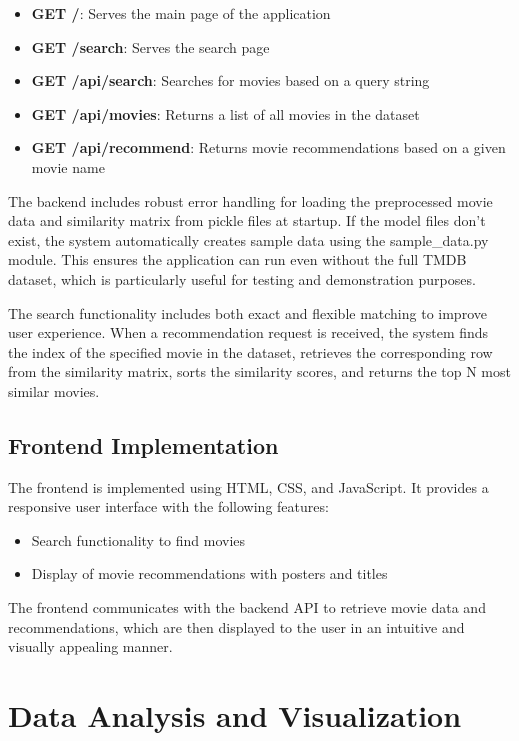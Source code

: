 \documentclass[12pt,a4paper]{article}
\begin{document}
\begin{itemize}
    \item \textbf{GET /}: Serves the main page of the application
    \item \textbf{GET /search}: Serves the search page
    \item \textbf{GET /api/search}: Searches for movies based on a query string
    \item \textbf{GET /api/movies}: Returns a list of all movies in the dataset
    \item \textbf{GET /api/recommend}: Returns movie recommendations based on a given movie name
\end{itemize}

The backend includes robust error handling for loading the preprocessed movie data and similarity matrix from pickle files at startup. If the model files don't exist, the system automatically creates sample data using the sample\_data.py module. This ensures the application can run even without the full TMDB dataset, which is particularly useful for testing and demonstration purposes.

The search functionality includes both exact and flexible matching to improve user experience. When a recommendation request is received, the system finds the index of the specified movie in the dataset, retrieves the corresponding row from the similarity matrix, sorts the similarity scores, and returns the top N most similar movies.

\subsection{Frontend Implementation}

The frontend is implemented using HTML, CSS, and JavaScript. It provides a responsive user interface with the following features:

\begin{itemize}
    \item Search functionality to find movies
    \item Display of movie recommendations with posters and titles
\end{itemize}

The frontend communicates with the backend API to retrieve movie data and recommendations, which are then displayed to the user in an intuitive and visually appealing manner.

\section{Data Analysis and Visualization}
\end{document}
